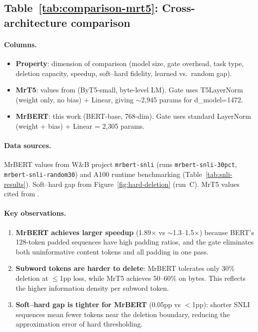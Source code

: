 \documentclass{article} %
\begin{document}
\subsection{Table~\ref{tab:comparison-mrt5}: Cross-architecture comparison}

\paragraph{Columns.}
\begin{itemize}[nosep]
    \item \textbf{Property}: dimension of comparison (model size, gate overhead, task type, deletion capacity, speedup, soft--hard fidelity, learned vs.\ random gap).
    \item \textbf{MrT5}: values from \citet{kallini2024mrt5} (ByT5-small, byte-level LM). Gate uses T5LayerNorm (weight only, no bias) + Linear, giving $\sim$2{,}945 params for d\_model=1472.
    \item \textbf{MrBERT}: this work (BERT-base, 768-dim). Gate uses standard LayerNorm (weight + bias) + Linear = 2{,}305 params.
\end{itemize}

\paragraph{Data sources.}
MrBERT values from W\&B project \texttt{mrbert-snli} (runs \texttt{mrbert-snli-30pct}, \texttt{mrbert-snli-random30}) and A100 runtime benchmarking (Table~\ref{tab:snli-results}). Soft--hard gap from Figure~\ref{fig:hard-deletion} (run~C). MrT5 values cited from \citet{kallini2024mrt5}.

\paragraph{Key observations.}
\begin{enumerate}[nosep]
    \item \textbf{MrBERT achieves larger speedup} (1.89$\times$ vs $\sim$1.3--1.5$\times$) because BERT's 128-token padded sequences have high padding ratios, and the gate eliminates both uninformative content tokens and all padding in one pass.
    \item \textbf{Subword tokens are harder to delete}: MrBERT tolerates only 30\% deletion at $\leq$1pp loss, while MrT5 achieves 50--60\% on bytes. This reflects the higher information density per subword token.
    \item \textbf{Soft--hard gap is tighter for MrBERT} (0.05pp vs $<$1pp): shorter SNLI sequences mean fewer tokens near the deletion boundary, reducing the approximation error of hard thresholding.
\end{enumerate}
\end{document}
